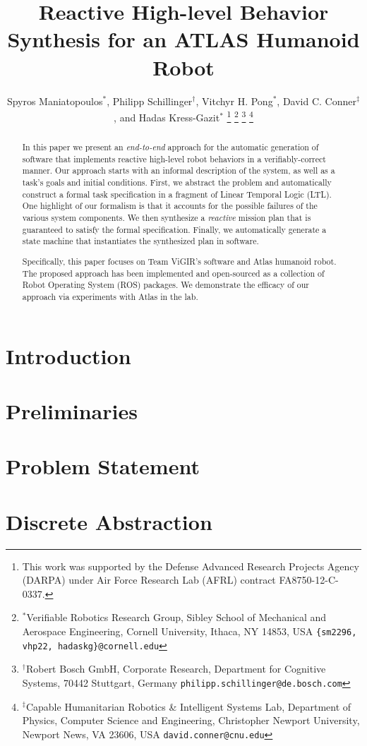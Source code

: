 \documentclass[letterpaper, 10 pt, conference]{ieeeconf}	%
\title{\LARGE \bf
	Reactive High-level Behavior Synthesis for an ATLAS Humanoid Robot
}
\author{Spyros Maniatopoulos$^{*}$, Philipp Schillinger$^{\dagger}$, Vitchyr H. Pong$^{*}$, David C. Conner$^{\ddagger}$, and Hadas Kress-Gazit$^{*}$%
\thanks{This work was supported by the Defense Advanced Research Projects Agency (DARPA) under Air Force Research Lab (AFRL) contract FA8750-12-C-0337.}
\thanks{$^{*}$Verifiable Robotics Research Group, Sibley School of Mechanical and Aerospace Engineering, Cornell University, Ithaca, NY 14853, USA {\tt \{sm2296, vhp22, hadaskg\}\nolinkurl{@cornell.edu}}}
\thanks{$^{\dagger}$Robert Bosch GmbH, Corporate Research, Department for Cognitive Systems, 70442 Stuttgart, Germany {\tt philipp.schillinger\nolinkurl{@de.bosch.com}}}
\thanks{$^{\ddagger}$Capable Humanitarian Robotics \& Intelligent Systems Lab, Department of Physics, Computer Science and Engineering, Christopher Newport University, Newport News, VA 23606, USA {\tt david.conner\nolinkurl{@cnu.edu}}}
}%
\begin{document}
%
\maketitle
\thispagestyle{empty}
\pagestyle{empty}
%
\begin{abstract}
In this paper we present an \emph{end-to-end} approach for the automatic generation of software that implements reactive high-level robot behaviors in a verifiably-correct manner.
Our approach starts with an informal description of the system, as well as a task's goals and initial conditions.
First, we abstract the problem and automatically construct a formal task specification in a fragment of Linear Temporal Logic (\textsc{LTL}).
One highlight of our formalism is that it accounts for the possible failures of the various system components.
We then synthesize a \emph{reactive} mission plan that is guaranteed to satisfy the formal specification.
Finally, we automatically generate a state machine that instantiates the synthesized plan in software.

Specifically, this paper focuses on Team ViGIR's software and Atlas humanoid robot.
The proposed approach has been implemented and open-sourced as a collection of Robot Operating System (ROS) packages.
We demonstrate the efficacy of our approach via experiments with Atlas in the lab.

\end{abstract}
%
%
\newpage
%
%
\section{Introduction}\label{S:intro}

%
\section{Preliminaries}\label{S:prelim}

%
\section{Problem Statement}\label{S:problem}

%
\section{Discrete Abstraction}\label{S:abstraction}

%
\end{document}
